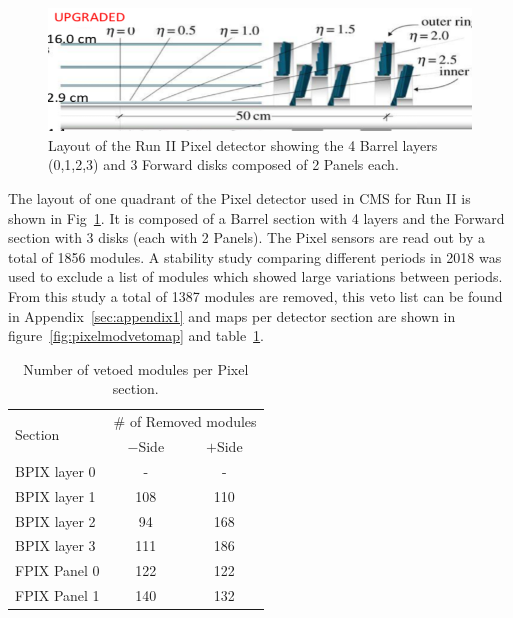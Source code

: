 
\begin{figure}[t]
  \begin{center}
    \includegraphics[width=0.9\linewidth]{plots/PixLayout.png}
    \caption{
      Layout of the Run II Pixel detector showing the 4 Barrel layers (0,1,2,3) and 3 Forward disks composed of 2 Panels each. 
    \label{fig:pixellayout}
    }
  \end{center}
\end{figure}


The layout of one quadrant of the Pixel detector used in CMS for  Run II is shown in Fig~\ref{fig:pixellayout}.
It is composed of a Barrel section with 4 layers and the Forward section with 3 disks (each with 2 Panels).
The Pixel sensors are read out by a total of 1856 modules.
A stability study comparing different periods in 2018 was used to exclude a list of modules which showed large variations between periods.
From this study a total of 1387 modules are removed, this veto list can be found in Appendix~\ref{sec:appendix1} and maps per detector section are shown in figure~\ref{fig:pixelmodvetomap} and table~\ref{tab:pixveto}.


\begin{table}[hc]
\caption{Number of vetoed modules per Pixel section.}
\label{tab:pixveto}
\begin{center}
\begin{tabular}{l|c|c}
\hline
\multirow{2}{*}{Section} & \multicolumn{2}{c}{$\#$ of Removed modules}  \\
  & $-$Side & $+$Side \\
\hline
BPIX layer 0 & - & - \\
BPIX layer 1 & 108 & 110 \\
BPIX layer 2 & 94  & 168 \\
BPIX layer 3 & 111 & 186 \\
FPIX Panel 0 & 122 & 122 \\
FPIX Panel 1 & 140 & 132 \\
\hline\hline
\end{tabular}
\end{center}
\end{table}


